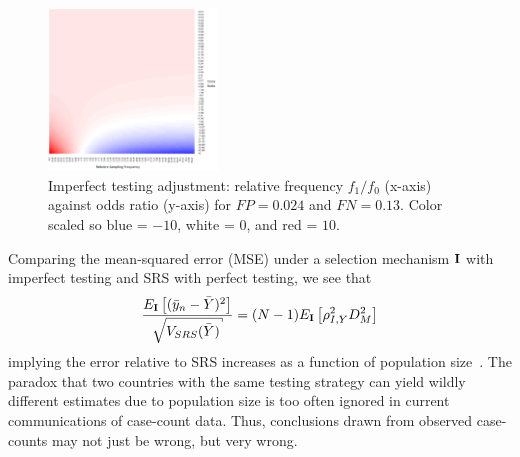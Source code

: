 \documentclass[11pt]{amsart}
\numberwithin{equation}{section}
\theoremstyle{plain}
\def\I{\bf I}
\begin{document}
\begin{figure}[!th]
\centering
\includegraphics[width = 0.4\textwidth]{../figs/mem_heatmap_article.png}
\caption{Imperfect testing adjustment: relative frequency $f_1/f_0$ (x-axis) against odds ratio (y-axis) for $FP=0.024$ and $FN=0.13$. Color scaled so blue = $-10$, white = $0$, and red = $10$.}
\label{fig:heatmap}
\vspace{-0.3cm}
\end{figure}

Comparing the mean-squared error (MSE) under a selection mechanism $\I$ with imperfect testing and SRS with perfect testing, we see that
$$
\frac{E_{\I} \left[ (\bar y_n - \bar Y)^2 \right]}{\sqrt{V_{SRS} (\bar Y)}} = (N-1) E_{\I} \left[ \rho_{I,Y}^2 D_M^2 \right]
$$
implying the error relative to SRS increases as a function of population size~\citep{Meng2018}. The paradox that two countries with the same testing strategy can yield wildly different estimates due to population size is too often ignored in current communications of case-count data.  Thus, conclusions drawn from observed case-counts may not just be wrong, but very wrong.
\end{document}
